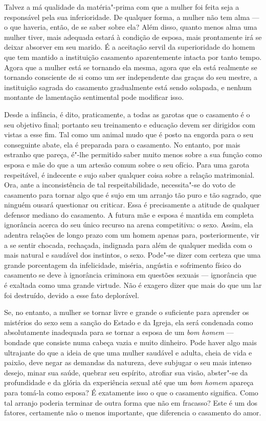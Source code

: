 \begin{multicols}{2}
Talvez a má qualidade da matéria"-prima com que a mulher foi feita seja a
responsável pela sua inferioridade. De qualquer forma, a mulher não tem
alma --- o que haveria, então, de se saber sobre ela? Além disso, quanto
menos alma uma mulher tiver, mais adequada estará à condição de esposa,
mais prontamente irá se deixar absorver em seu marido. É a aceitação
servil da superioridade do homem que tem mantido a instituição casamento
aparentemente intacta por tanto tempo. Agora que a mulher está se
tornando ela mesma, agora que ela está realmente se tornando consciente
de si como um ser independente das graças do seu mestre, a instituição
sagrada do casamento gradualmente está sendo solapada, e nenhum montante
de lamentação sentimental pode modificar isso.

Desde a infância, é dito, praticamente, a todas as garotas que o
casamento é o seu objetivo final; portanto seu treinamento e educação
devem ser dirigidos com vistas a esse fim. Tal como um animal mudo que é
posto na engorda para o seu conseguinte abate, ela é preparada para o
casamento. No entanto, por mais estranho que pareça, é"-lhe permitido
saber muito menos sobre a sua função como esposa e mãe do que a um
artesão comum sobre o seu ofício. Para uma garota respeitável, é\label{artesao}
indecente e sujo saber qualquer coisa sobre a relação matrimonial. Ora,
ante a inconsistência de tal respeitabilidade, necessita"-se do voto
de casamento para tornar algo que é sujo em um arranjo tão puro e tão
sagrado, que ninguém ousará questionar ou criticar.
Essa é precisamente a atitude de qualquer defensor mediano do
casamento. A futura mãe e esposa é mantida em completa ignorância acerca do seu
único recurso na arena competitiva: o sexo. Assim, ela adentra relações
de longo prazo com um homem apenas para, posteriormente, vir a se sentir
chocada, rechaçada, indignada para além de qualquer medida com o mais
natural e saudável dos instintos, o sexo. Pode"-se dizer com certeza que
uma grande porcentagem da infelicidade, miséria, angústia e sofrimento
físico do casamento se deve à ignorância criminosa em questões sexuais
--- ignorância que é exaltada como uma grande virtude. Não é exagero
dizer que mais do que um lar foi destruído, devido a esse fato
deplorável.

Se, no entanto, a mulher se tornar livre e grande o suficiente para
aprender os mistérios do sexo sem a sanção do Estado e da Igreja, ela
será condenada como absolutamente inadequada para se tornar a esposa de
um \textit{bom homem} --- bondade que consiste numa cabeça vazia e muito
dinheiro. Pode haver algo mais ultrajante do que a ideia de que uma
mulher saudável e adulta, cheia de vida e paixão, deve negar as demandas
da natureza, deve subjugar o seu mais intenso desejo, minar sua saúde,
quebrar seu espírito, atrofiar sua visão, abster"-se da profundidade
e da glória da experiência sexual até que um \textit{bom homem} apareça
para tomá-la como esposa? É exatamente isso o que o casamento significa.
Como tal arranjo poderia terminar de outra forma que não em fracasso?
Este é um dos fatores, certamente não o menos importante, que
diferencia o casamento do amor.


\end{multicols}
